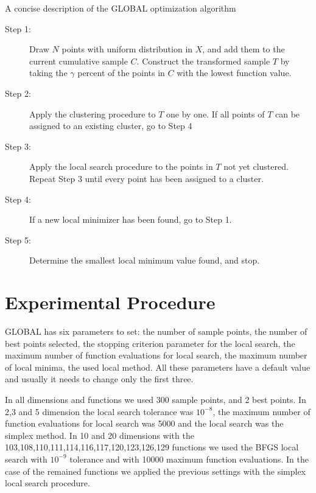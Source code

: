 \documentclass{sig-alternate}
\begin{document}
\begin{algorithm}

\caption{A concise description of the GLOBAL optimization algorithm}

\begin{description}
\item[Step 1:] Draw $N$ points with uniform distribution in $X$, and add them to the
current cumulative sample $C$. Construct the transformed sample $T$ by taking
the $\gamma$ percent of the points in $C$ with the lowest function value.

\item[Step 2:] Apply the clustering procedure to $T$ one by one. If all points of $T$ can be
assigned to an existing cluster, go to Step 4

\item[Step 3:] Apply the local search procedure to the points in $T$ not yet
clustered. Repeat Step 3 until every point has been assigned to a cluster.

\item[Step 4:]If a new local minimizer has been found, go to Step 1.

\item[Step 5:] Determine the smallest local minimum value found, and stop.
\end{description} \label{a1}
\end{algorithm}


%
 \section{Experimental Procedure}

GLOBAL has six parameters to set: the number of sample points, the number of best points selected, the stopping criterion parameter for the local search, the maximum number of function evaluations for local search, the maximum number of local minima, the used local method. All these parameters have a default value and usually it needs to change only the first three.

In all dimensions and functions we used 300 sample points, and 2 best points. In 2,3 and 5 dimension the local search tolerance was $10^{-8}$, the maximum number of function evaluations for local search was 5000 and the local search was the simplex method. In 10 and 20 dimensions with the 103,108,110,111,114,116,117,120,123,126,129 functions we used the BFGS local search with $10^{-9}$ tolerance and with 10000 maximum function evaluations. In the case of the remained functions we applied the previous settings with the simplex local search procedure.
\end{document}
